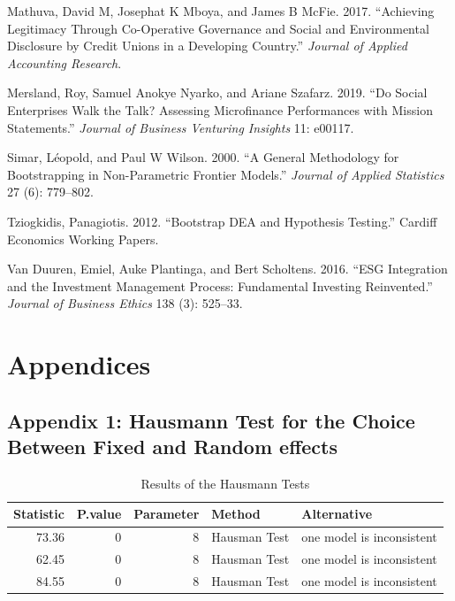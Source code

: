 \documentclass[
]{article}
\newlength{\cslhangindent}
\newlength{\cslentryspacingunit} %
\newenvironment{CSLReferences}[2] %
 {%
  \setlength{\parindent}{0pt}
  \ifodd #1
  \let\oldpar\par
  \def\par{\hangindent=\cslhangindent\oldpar}
  \fi
  \setlength{\parskip}{#2\cslentryspacingunit}
 }%
 {}
\begin{document}
\begin{CSLReferences}{1}{0}
\leavevmode{}%
Mathuva, David M, Josephat K Mboya, and James B McFie. 2017.
{``Achieving Legitimacy Through Co-Operative Governance and Social and
Environmental Disclosure by Credit Unions in a Developing Country.''}
\emph{Journal of Applied Accounting Research}.

\leavevmode{}%
Mersland, Roy, Samuel Anokye Nyarko, and Ariane Szafarz. 2019. {``Do
Social Enterprises Walk the Talk? Assessing Microfinance Performances
with Mission Statements.''} \emph{Journal of Business Venturing
Insights} 11: e00117.

\leavevmode{}%
Simar, Léopold, and Paul W Wilson. 2000. {``A General Methodology for
Bootstrapping in Non-Parametric Frontier Models.''} \emph{Journal of
Applied Statistics} 27 (6): 779--802.

\leavevmode{}%
Tziogkidis, Panagiotis. 2012. {``Bootstrap DEA and Hypothesis
Testing.''} Cardiff Economics Working Papers.

\leavevmode{}%
Van Duuren, Emiel, Auke Plantinga, and Bert Scholtens. 2016. {``ESG
Integration and the Investment Management Process: Fundamental Investing
Reinvented.''} \emph{Journal of Business Ethics} 138 (3): 525--33.

\end{CSLReferences}

\hypertarget{appendices}{%
\section{Appendices}\label{appendices}}

\hypertarget{appendix-1-hausmann-test-for-the-choice-between-fixed-and-random-effects}{%
\subsection{Appendix 1: Hausmann Test for the Choice Between Fixed and
Random
effects}\label{appendix-1-hausmann-test-for-the-choice-between-fixed-and-random-effects}}

\begin{table}

\caption{\label{tab:unnamed-chunk-36}Results of the Hausmann Tests}
\centering
\begin{tabular}[t]{rrrll}
\toprule
Statistic & P.value & Parameter & Method & Alternative\\
\midrule
73.36 & 0 & 8 & Hausman Test & one model is inconsistent\\
62.45 & 0 & 8 & Hausman Test & one model is inconsistent\\
84.55 & 0 & 8 & Hausman Test & one model is inconsistent\\
\bottomrule
\end{tabular}
\end{table}
\end{document}
